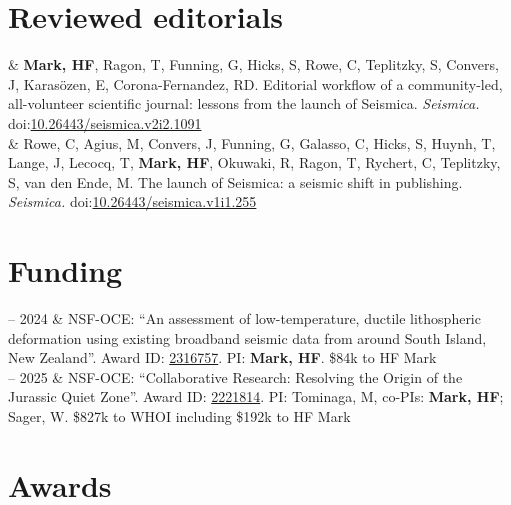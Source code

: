 \documentclass[10pt, letterpaper]{article}
\newcommand{\LastName}{Mark}
\newcommand{\Initials}{HF}  %
\newcommand{\Me}{\textbf{\LastName, \Initials}}  %
\newcommand{\Masako}{Tominaga, M}
\newcommand{\WSage}{Sager, W}
\newcommand{\CRowe}{Rowe, C}
\newcommand{\MAgi}{Agius, M}
\newcommand{\JConv}{Convers, J}
\newcommand{\GFun}{Funning, G}
\newcommand{\CGal}{Galasso, C}
\newcommand{\SHic}{Hicks, S}
\newcommand{\THuy}{Huynh, T}
\newcommand{\JLan}{Lange, J}
\newcommand{\TLec}{Lecocq, T}
\newcommand{\ROku}{Okuwaki, R}
\newcommand{\Thea}{Ragon, T}
\newcommand{\CRyc}{Rychert, C}
\newcommand{\STep}{Teplitzky, S}
\newcommand{\MvdE}{van den Ende, M}
\newcommand{\EKar}{Karasözen, E}
\newcommand{\RDCF}{Corona-Fernandez, RD}
\newcommand{\DOI}[1]{doi:\href{https://doi.org/#1}{#1}}
\newcommand{\Duration}[2]{\fontsize{9pt}{0}\selectfont #1 -- #2}
\newcommand{\Year}[1]{\fontsize{9pt}{0}\selectfont #1}
\begin{document}
\section{Reviewed editorials}

\begin{EntriesTable}
\Year{2023}  &
  \Me, \Thea, \GFun, \SHic, \CRowe, \STep, \JConv, \EKar, \RDCF.
  Editorial workflow of a community-led, all-volunteer scientific journal: lessons from the launch of Seismica.
  \emph{Seismica.}
  \DOI{10.26443/seismica.v2i2.1091} \\
\Year{2022}  &
  \CRowe, \MAgi, \JConv, \GFun, \CGal, \SHic, \THuy, \JLan, \TLec, \Me, \ROku, \Thea, \CRyc, \STep, \MvdE. 
  The launch of Seismica: a seismic shift in publishing. 
  \emph{Seismica.}
  \DOI{10.26443/seismica.v1i1.255}
\end{EntriesTable}





\section{Funding}

\begin{EntriesTable}
  \Duration{2023}{2024}  &
  NSF-OCE: ``An assessment of low-temperature, ductile lithospheric deformation using existing broadband seismic data from around South Island, New Zealand''. \newline
  Award ID: \href{https://www.nsf.gov/awardsearch/showAward?AWD_ID=2316757}{2316757}.
  PI: \Me. \newline
  \small \$84k to HF Mark
  \\
  \Duration{2023}{2025}  &
  NSF-OCE: ``Collaborative Research: Resolving the Origin of the Jurassic Quiet Zone''. \newline
  Award ID: \href{https://www.nsf.gov/awardsearch/showAward?AWD_ID=2221814}{2221814}.
  PI: \Masako, co-PIs: \Me; \WSage. \newline
  \small \$827k to WHOI including \$192k to HF Mark
\end{EntriesTable}


\section{Awards}
\end{document}
